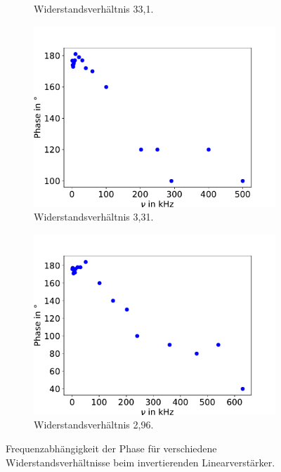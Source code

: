 \begin{figure}[H]
\begin{subfigure}{0.48\textwidth}
                        \caption{Widerstandsverhältnis 33,1.}
                        \label{fig:TU}
                    \end{subfigure}
                    \begin{subfigure}{0.48\textwidth}
                        \centering
                        \includegraphics[width=\textwidth]{phase3.pdf}%
                        \caption{Widerstandsverhältnis 3,31.}
                        \label{fig:TU}
                    \end{subfigure}
                    \begin{subfigure}{0.48\textwidth}
                        \centering
                        \includegraphics[width=\textwidth]{phase4.pdf}%
                        \caption{Widerstandsverhältnis 2,96.}
                        \label{fig:TU}
                    \end{subfigure}
                    \caption{Frequenzabhängigkeit der Phase für verschiedene Widerstandsverhältnisse beim invertierenden Linearverstärker.}
                    \label{fig:phase}
                \end{figure}

